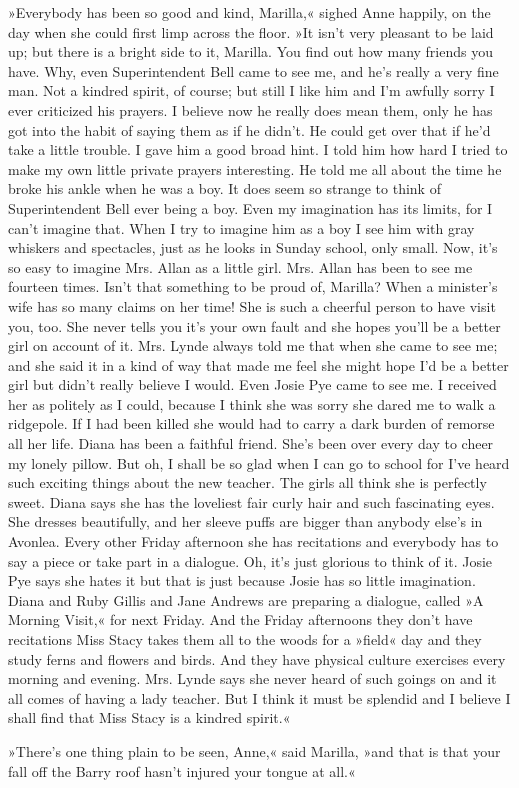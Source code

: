 »Everybody has been so good and kind, Marilla,« sighed Anne happily, on the day when she could first limp across the floor. »It isn't very pleasant to be laid up; but there is a bright side to it, Marilla. You find out how many friends you have. Why, even Superintendent Bell came to see me, and he's really a very fine man. Not a kindred spirit, of course; but still I like him and I'm awfully sorry I ever criticized his prayers. I believe now he really does mean them, only he has got into the habit of saying them as if he didn't. He could get over that if he'd take a little trouble. I gave him a good broad hint. I told him how hard I tried to make my own little private prayers interesting. He told me all about the time he broke his ankle when he was a boy. It does seem so strange to think of Superintendent Bell ever being a boy. Even my imagination has its limits, for I can't imagine that. When I try to imagine him as a boy I see him with gray whiskers and spectacles, just as he looks in Sunday school, only small. Now, it's so easy to imagine Mrs. Allan as a little girl. Mrs. Allan has been to see me fourteen times. Isn't that something to be proud of, Marilla? When a minister's wife has so many claims on her time! She is such a cheerful person to have visit you, too. She never tells you it's your own fault and she hopes you'll be a better girl on account of it. Mrs. Lynde always told me that when she came to see me; and she said it in a kind of way that made me feel she might hope I'd be a better girl but didn't really believe I would. Even Josie Pye came to see me. I received her as politely as I could, because I think she was sorry she dared me to walk a ridgepole. If I had been killed she would had to carry a dark burden of remorse all her life. Diana has been a faithful friend. She's been over every day to cheer my lonely pillow. But oh, I shall be so glad when I can go to school for I've heard such exciting things about the new teacher. The girls all think she is perfectly sweet. Diana says she has the loveliest fair curly hair and such fascinating eyes. She dresses beautifully, and her sleeve puffs are bigger than anybody else's in Avonlea. Every other Friday afternoon she has recitations and everybody has to say a piece or take part in a dialogue. Oh, it's just glorious to think of it. Josie Pye says she hates it but that is just because Josie has so little imagination. Diana and Ruby Gillis and Jane Andrews are preparing a dialogue, called »A Morning Visit,« for next Friday. And the Friday afternoons they don't have recitations Miss Stacy takes them all to the woods for a »field« day and they study ferns and flowers and birds. And they have physical culture exercises every morning and evening. Mrs. Lynde says she never heard of such goings on and it all comes of having a lady teacher. But I think it must be splendid and I believe I shall find that Miss Stacy is a kindred spirit.«

»There's one thing plain to be seen, Anne,« said Marilla, »and that is that your fall off the Barry roof hasn't injured your tongue at all.«